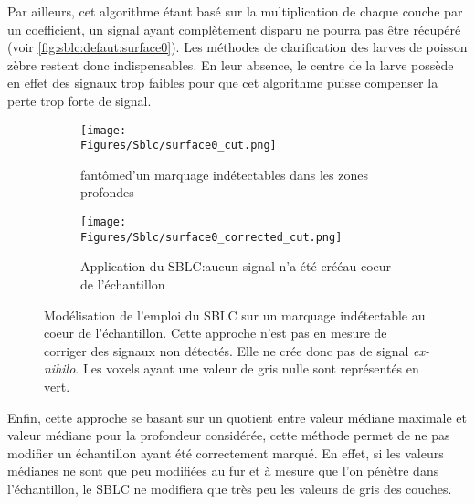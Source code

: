 \documentclass[\main/main.tex]{subfiles}
\begin{document}
%
Par ailleurs, cet algorithme étant basé sur la multiplication de chaque couche par
un coefficient, un signal ayant complètement disparu ne pourra pas être récupéré (voir \autoref{fig:sblc:defaut:surface0}). Les méthodes de clarification des larves de poisson zèbre restent donc indispensables. En leur absence, le centre de la larve possède en effet des signaux trop faibles pour que cet algorithme puisse compenser la perte trop forte de signal.
%
\begin{figure}[h!]
    \centering
    \begin{subfigure}[b]{0.45\textwidth}
        
        \caption{fantôme\newline d'un marquage indétectables dans les zones profondes}
        \centering \texttt{[image: \\Figures/Sblc/surface0\_cut.png]}
        \label{fig:sblc:defaut:surface0:application}
    \end{subfigure}
    \begin{subfigure}[b]{0.45\textwidth} 
        \caption{Application du SBLC:\newline aucun signal n'a été créé\newline au coeur de l'échantillon}
        \centering \texttt{[image: \\Figures/Sblc/surface0\_corrected\_cut.png]}
        \label{fig:sblc:defaut:surface0:application}
    \end{subfigure}
    \caption{
        Modélisation de l'emploi du SBLC sur un marquage indétectable au coeur de l'échantillon.
        \newline
        Cette approche n'est pas en mesure de corriger des signaux non détectés.
        Elle ne crée donc pas de signal \emph{ex\hyp{}nihilo}.
        \newline
        Les voxels ayant une valeur de gris nulle sont représentés en vert.
        }
    \label{fig:sblc:defaut:surface0}
\end{figure}

%
Enfin, cette approche se basant sur un quotient entre valeur médiane maximale et valeur médiane pour la profondeur considérée, cette méthode permet de ne pas modifier un échantillon ayant été correctement marqué.
%
En effet, si les valeurs médianes ne sont que peu modifiées au fur et à mesure que l'on pénètre dans l'échantillon, le SBLC ne modifiera que très peu les valeurs de gris des couches.
\end{document}
